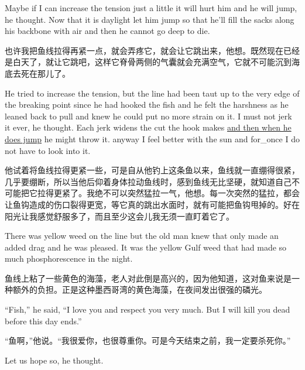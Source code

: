 \begin{paracol}{2}
\switchcolumn*

Maybe if I can increase the tension just a little it will hurt him and he
will jump, he thought. Now that it is daylight let him jump so that he'll
fill the sacks along his \gls{backbone} with air and then he cannot go deep to
die.

\switchcolumn

也许我把鱼线拉得再紧一点，就会弄疼它，就会让它跳出来，他想。既然现在已经是白天了，就让它跳吧，这样它脊骨两侧的气囊就会充满空气，它就不可能沉到海底去死在那儿了。

\switchcolumn*

He tried to increase the tension, but the line had been taut up to the very
edge of the breaking point since he had hooked the fish and he felt the
\gls{harshness} as he leaned back to pull and knew he could put no more
strain on it. I must not jerk it ever, he thought. Each jerk \glspl{widen}
the cut the hook makes \uline{and then when he does jump} he might throw it.
\Gls{anyway} I feel better with the sun and \gls{for_once} I do not have to look
into it.

\switchcolumn

他试着将鱼线拉得更紧一些，可是自从他钓上这条鱼以来，鱼线就一直绷得很紧，几乎要绷断，所以当他后仰着身体拉动鱼线时，感到鱼线无比坚硬，就知道自己不可能把它拉得更紧了。我绝不可以突然猛拉一气，他想。每一次突然的猛拉，都会让鱼钩造成的伤口裂得更宽，等它真的跳出水面时，就有可能把鱼钩甩掉的。好在阳光让我感觉舒服多了，而且至少这会儿我无须一直盯着它了。

\switchcolumn*

There was yellow weed on the line but the old man knew that only made an
added \gls{drag} and he was pleased. It was the yellow Gulf weed that had
made so much phosphorescence in the night.

\switchcolumn

鱼线上粘了一些黄色的海藻，老人对此倒是高兴的，因为他知道，这对鱼来说是一种额外的负担。正是这种墨西哥湾的黄色海藻，在夜间发出很强的磷光。

\switchcolumn*

``Fish,'' he said, ``I love you and respect you very much. But I will kill
you dead before this day ends.''

\switchcolumn

“鱼啊，”他说。“我很爱你，也很尊重你。可是今天结束之前，我一定要杀死你。”

\switchcolumn*

Let us hope so, he thought.


\end{paracol}
